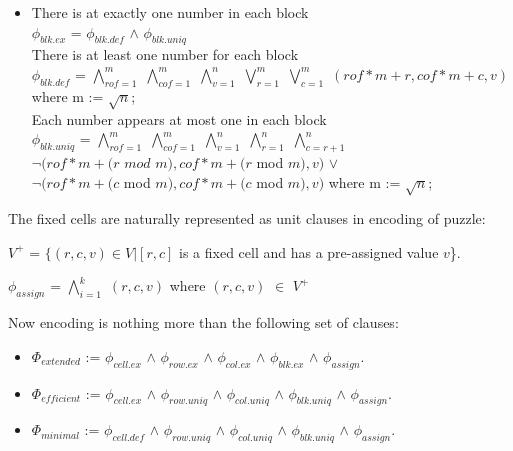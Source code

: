 \documentclass[letterpaper]{article}
\begin{document}
\begin{itemize}
\item There is at exactly one number in each block\\
$\phi_{blk.ex}$ = $\phi_{blk.def}$ $\wedge$ $\phi_{blk.uniq}$\\
There is at least one number for each block \\
 $\phi_{blk.def}$ = $\bigwedge_{rof=1}^{m}$ $\bigwedge_{cof=1}^{m}$ $\bigwedge_{v=1}^n$ $\bigvee_{r=1}^{m}$ $\bigvee_{c=1}^{m}$ $(rof \ast m + r,cof \ast m + c,v)$ where m := $\sqrt{n}$;\\
Each number appears at most one in each block\\
$\phi_{blk.uniq}$ = $\bigwedge_{rof=1}^{m}$ $\bigwedge_{cof=1}^{m}$ $\bigwedge_{v=1}^n$ $\bigwedge_{r=1}^{n}$ $\bigwedge_{c = r +1}^{n}$ \\
$\neg(rof \ast m + (r$ $mod$ $m),cof \ast m + (r$ mod $m),v)$ $\vee$ \\
$\neg(rof \ast m + (c$ mod $m),cof \ast m + (c$ mod $m),v)$ where m := $\sqrt{n}$;
\end{itemize}

\noindent The fixed cells are naturally represented as unit clauses in encoding of puzzle:

$V^{+}$ = $\{ (r,c,v) \in V | [r,c]$ is a fixed cell and has a pre-assigned  value $v$\}.

$\phi_{assign}$ = $\bigwedge_{i=1}^k$ $(r,c,v)$ where $(r,c,v)$ $\in$ $V^{+}$

\noindent Now encoding is nothing more than the following set of clauses:

\begin{itemize}
\item $\Phi_{extended}$ := $\phi_{cell.ex}$ $\wedge$ $\phi_{row.ex}$ $\wedge$ $\phi_{col.ex}$ $\wedge$ $\phi_{blk.ex}$ $\wedge$ $\phi_{assign}$. 

\item $\Phi_{efficient}$ := $\phi_{cell.ex}$ $\wedge$ $\phi_{row.uniq}$ $\wedge$ $\phi_{col.uniq}$ $\wedge$ $\phi_{blk.uniq}$ $\wedge$ $\phi_{assign}$. 

\item $\Phi_{minimal}$ := $\phi_{cell.def}$ $\wedge$ $\phi_{row.uniq}$ $\wedge$ $\phi_{col.uniq}$ $\wedge$ $\phi_{blk.uniq}$ $\wedge$ $\phi_{assign}$. 
 
\end{itemize}
\end{document}
